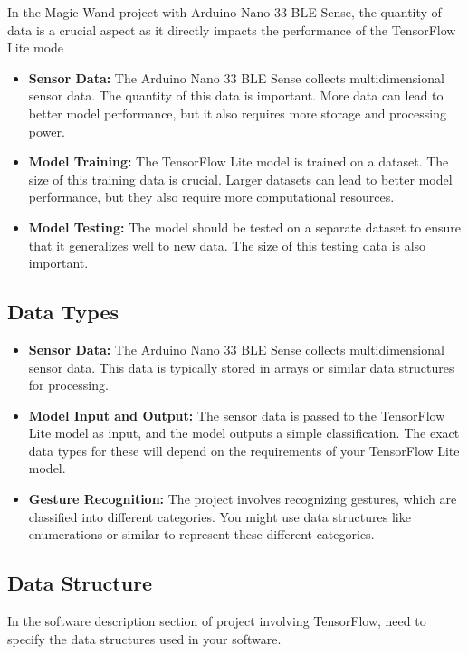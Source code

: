 In the Magic Wand project with Arduino Nano 33 BLE Sense, the quantity of data is a crucial aspect as it directly impacts the performance of the TensorFlow Lite mode

\begin{itemize}
	\item \textbf{Sensor Data:} The Arduino Nano 33 BLE Sense collects multidimensional sensor data. The quantity of this data is important. More data can lead to better model performance, but it also requires more storage and processing power.
	\item \textbf{Model Training:} The TensorFlow Lite model is trained on a dataset. The size of this training data is crucial. Larger datasets can lead to better model performance, but they also require more computational resources.
	\item \textbf{Model Testing:} The model should be tested on a separate dataset to ensure that it generalizes well to new data. The size of this testing data is also important.
\end{itemize}

\subsection{Data Types}

\begin{itemize}
	\item \textbf{Sensor Data:} The Arduino Nano 33 BLE Sense collects multidimensional sensor data. This data is typically stored in arrays or similar data structures for processing.
	\item \textbf{Model Input and Output:} The sensor data is passed to the TensorFlow Lite model as input, and the model outputs a simple classification. The exact data types for these will depend on the requirements of your TensorFlow Lite model.
	\item \textbf{Gesture Recognition:} The project involves recognizing gestures, which are classified into different categories. You might use data structures like enumerations or similar to represent these different categories.
\end{itemize}


\subsection{Data Structure}

In the software description section of project involving TensorFlow, need to specify the data structures used in your software. 

